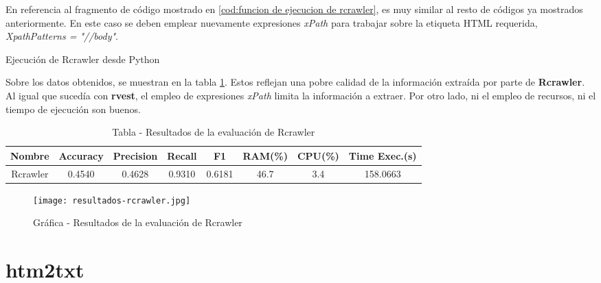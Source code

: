 En referencia al fragmento de código mostrado en \ref{cod:funcion de ejecucion de rcrawler}, es muy similar
al resto de códigos ya mostrados anteriormente. En este caso se deben emplear nuevamente expresiones
\emph{xPath} para trabajar sobre la etiqueta HTML requerida, \emph{XpathPatterns = "//body"}.

\begin{codefloat}
    
    \caption{Ejecución de Rcrawler desde Python}
    \label{cod:ejecucion de rcrawler desde python}
\end{codefloat}

Sobre los datos obtenidos, se muestran en la tabla \ref{tab:tabla - resultados de la evaluacion de rcrawler}.
Estos reflejan una pobre calidad de la información extraída por parte de \textbf{Rcrawler}. Al igual que
sucedía con \textbf{rvest}, el empleo de expresiones \emph{xPath} limita la información a extraer. Por otro 
lado, ni el empleo de recursos, ni el tiempo de ejecución son buenos.

\begin{table}[h]
    \begin{center}
      \begin{tabular}{| c | c | c | c | c | c | c | c |} \hline 
       \textbf{Nombre} & \textbf{Accuracy} & \textbf{Precision}  & \textbf{Recall} & \textbf{F1} & \textbf{RAM(\%)} & \textbf{CPU(\%)} & \textbf{Time Exec.(s)} \\ \hline
       Rcrawler & 0.4540 & 0.4628 & 0.9310 & 0.6181 & 46.7 & 3.4 & 158.0663 \\ \hline
      \end{tabular}
      \caption{Tabla - Resultados de la evaluación de Rcrawler}
      \label{tab:tabla - resultados de la evaluacion de rcrawler}
    \end{center}
\end{table}

\begin{figure}[tphb]
    \centering
    \texttt{[image: resultados-rcrawler.jpg]}
    \caption{Gráfica - Resultados de la evaluación de Rcrawler}
    \label{img:grafica - resultados de la evaluacion de rcrawler}
\end{figure}

\section*{htm2txt}

